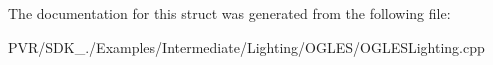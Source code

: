 The documentation for this struct was generated from the following file\+:\begin{DoxyCompactItemize}
\item 
P\+V\+R/\+S\+D\+K\+\_./\+Examples/\+Intermediate/\+Lighting/\+O\+G\+L\+E\+S/O\+G\+L\+E\+S\+Lighting.\+cpp\end{DoxyCompactItemize}
